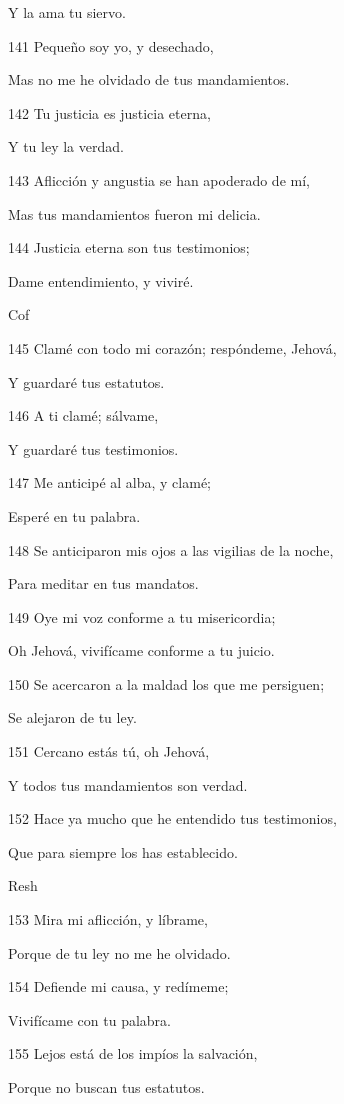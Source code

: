 \par Y la ama tu siervo.
\par 141 Pequeño soy yo, y desechado,
\par Mas no me he olvidado de tus mandamientos.
\par 142 Tu justicia es justicia eterna,
\par Y tu ley la verdad.
\par 143 Aflicción y angustia se han apoderado de mí,
\par Mas tus mandamientos fueron mi delicia.
\par 144 Justicia eterna son tus testimonios;
\par Dame entendimiento, y viviré.
\par Cof
\par 145 Clamé con todo mi corazón; respóndeme, Jehová,
\par Y guardaré tus estatutos.
\par 146 A ti clamé; sálvame,
\par Y guardaré tus testimonios.
\par 147 Me anticipé al alba, y clamé;
\par Esperé en tu palabra.
\par 148 Se anticiparon mis ojos a las vigilias de la noche,
\par Para meditar en tus mandatos.
\par 149 Oye mi voz conforme a tu misericordia;
\par Oh Jehová, vivifícame conforme a tu juicio.
\par 150 Se acercaron a la maldad los que me persiguen;
\par Se alejaron de tu ley.
\par 151 Cercano estás tú, oh Jehová,
\par Y todos tus mandamientos son verdad.
\par 152 Hace ya mucho que he entendido tus testimonios,
\par Que para siempre los has establecido.
\par Resh
\par 153 Mira mi aflicción, y líbrame,
\par Porque de tu ley no me he olvidado.
\par 154 Defiende mi causa, y redímeme;
\par Vivifícame con tu palabra.
\par 155 Lejos está de los impíos la salvación,
\par Porque no buscan tus estatutos.
